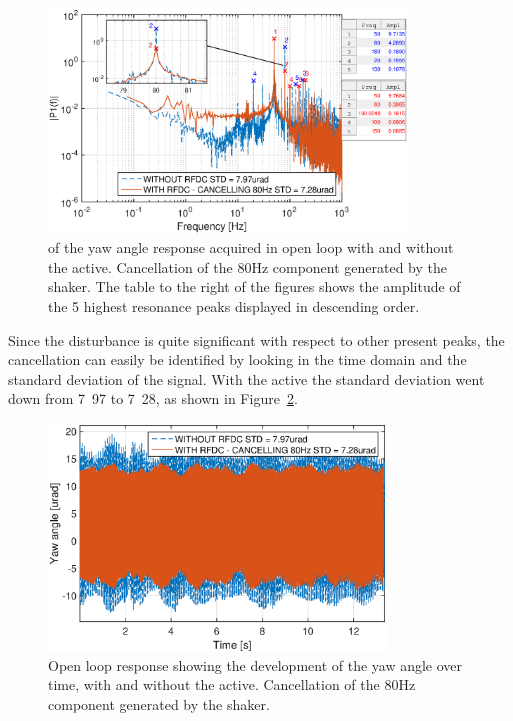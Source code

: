 \begin{figure}[h]
  \centering %
  \includegraphics[width=0.85\textwidth]{fig/matlab/fft_openloop_ext_disturbance_80Hz_with_zoom}
  \caption{\label{fig:fft_openloop_80} \abbrFFT of the yaw angle response acquired in open loop with and without the \abbrRFDC active. Cancellation of the 80Hz component generated by the shaker. The table to the right of the figures shows the amplitude of the 5 highest resonance peaks displayed in descending order.}
\end{figure}

Since the disturbance is quite significant with respect to other present peaks, the cancellation can easily be identified by looking in the time domain and the standard deviation of the signal. With the \abbrRFDC active the standard deviation went down from \unit{7.97}{\micro\radian} to \unit{7.28}{\micro\radian}, as shown in Figure~\ref{fig:yl_openloop_80}.

\begin{figure}[h]
  \centering %
  \includegraphics[width=0.8\textwidth]{fig/matlab/yl_openloop_ext_disturbance_80Hz}
  \caption{\label{fig:yl_openloop_80} Open loop response showing the development of the yaw angle over time, with and without the \abbrRFDC active. Cancellation of the 80Hz component generated by the shaker.}
\end{figure}

